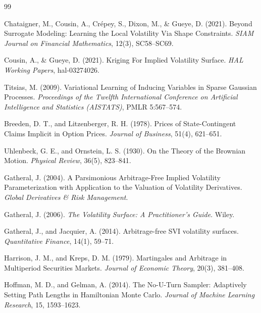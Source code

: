 \documentclass[12pt,oneside]{report}
\theoremstyle{definition}
\theoremstyle{remark}
\begin{document}
\begin{thebibliography}{99}

Chataigner, M., Cousin, A., Cr\'epey, S., Dixon, M., \& Gueye, D. (2021).
Beyond Surrogate Modeling: Learning the Local Volatility Via Shape Constraints.
\textit{SIAM Journal on Financial Mathematics}, 12(3), SC58--SC69.

Cousin, A., \& Gueye, D. (2021).
Kriging For Implied Volatility Surface.
\textit{HAL Working Papers}, hal-03274026.

Titsias, M. (2009).
Variational Learning of Inducing Variables in Sparse Gaussian Processes.
\textit{Proceedings of the Twelfth International Conference on Artificial Intelligence and Statistics (AISTATS)}, PMLR 5:567--574.

Breeden, D. T., and Litzenberger, R. H. (1978).
Prices of State-Contingent Claims Implicit in Option Prices.
\textit{Journal of Business}, 51(4), 621--651.

Uhlenbeck, G. E., and Ornstein, L. S. (1930).
On the Theory of the Brownian Motion.
\textit{Physical Review}, 36(5), 823--841.

Gatheral, J. (2004).
A Parsimonious Arbitrage-Free Implied Volatility Parameterization with Application to the Valuation of Volatility Derivatives.
\textit{Global Derivatives \& Risk Management}.

Gatheral, J. (2006).
\textit{The Volatility Surface: A Practitioner's Guide}.
Wiley.

Gatheral, J., and Jacquier, A. (2014).
Arbitrage-free SVI volatility surfaces.
\textit{Quantitative Finance}, 14(1), 59--71.

Harrison, J. M., and Kreps, D. M. (1979).
Martingales and Arbitrage in Multiperiod Securities Markets.
\textit{Journal of Economic Theory}, 20(3), 381--408.

Hoffman, M. D., and Gelman, A. (2014).
The No-U-Turn Sampler: Adaptively Setting Path Lengths in Hamiltonian Monte Carlo.
\textit{Journal of Machine Learning Research}, 15, 1593--1623.


\end{thebibliography}
\end{document}
